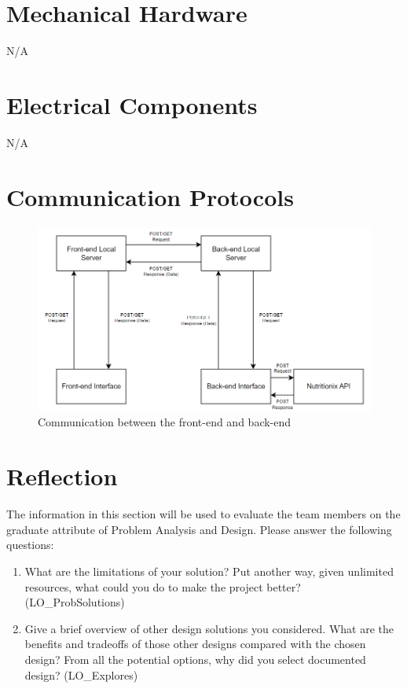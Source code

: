 \documentclass[12pt, titlepage]{article}
\begin{document}
\section{Mechanical Hardware}

N/A

\section{Electrical Components}

N/A

\section{Communication Protocols}

\begin{figure}[H]
	\centering
	\includegraphics[scale=0.85]{Communication_Protocols.png}
	\caption{Communication between the front-end and back-end}
\end{figure}

\section{Reflection}

The information in this section will be used to evaluate the team members on the
graduate attribute of Problem Analysis and Design.  Please answer the following questions:

\begin{enumerate}
  \item What are the limitations of your solution?  Put another way, given
  unlimited resources, what could you do to make the project better? (LO\_ProbSolutions)
  \item Give a brief overview of other design solutions you considered.  What
  are the benefits and tradeoffs of those other designs compared with the chosen
  design?  From all the potential options, why did you select documented design?
  (LO\_Explores)
\end{enumerate}
\end{document}
